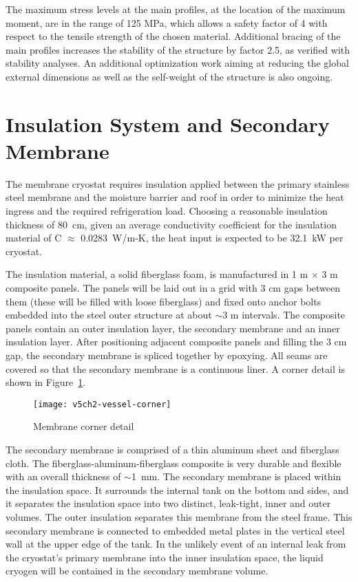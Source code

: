 The maximum stress levels at the main profiles, at the location of 
the maximum moment, are in the range of 125 MPa, which allows a 
safety factor of 4 with respect to the tensile strength of the 
chosen material. Additional bracing of the main profiles increases 
the stability of the structure by factor 2.5, as verified with 
stability analyses.  An additional optimization work aiming at 
reducing the global external dimensions as well as the self-weight 
of the structure is also ongoing. 

\section{Insulation System and Secondary Membrane}
\label{subsec:insul-2nd-mem}

The membrane cryostat requires insulation applied between the 
primary stainless steel membrane and the moisture barrier and 
roof in order to minimize the heat ingress and the required 
refrigeration load. Choosing a reasonable insulation 
thickness of 80~cm, given an average conductivity coefficient 
for the insulation material of C $\approx$ 0.0283~W/m-K, the 
heat input is expected to be 32.1~kW 
per cryostat. %



The insulation material, a solid fiberglass foam, is manufactured in 1 m 
$\times$ 3 m composite panels. The panels will be laid out in a grid with 
3 cm gaps between them (these will be filled with loose fiberglass) and 
fixed onto anchor bolts embedded into the steel outer structure
at about $\sim$3 m intervals. 
The composite panels contain an outer insulation layer, the secondary 
membrane and an inner insulation layer. After positioning adjacent 
composite panels and filling the 3 cm gap, the secondary membrane 
is spliced together by epoxying. All seams are covered so that the secondary
membrane is a continuous liner. A corner detail is shown 
in Figure~\ref{fig:vessel-corner}.


\begin{figure}[htbp]
\centering
\texttt{[image: v5ch2-vessel-corner]}
\caption{Membrane corner detail}
\label{fig:vessel-corner} %
\end{figure}

The secondary membrane is comprised of a thin aluminum sheet and 
fiberglass cloth. The fiberglass-aluminum-fiberglass composite is 
very durable and flexible with an overall thickness of $\sim$1~mm.  
The secondary membrane is placed within the insulation space. It 
surrounds the internal tank on the bottom and sides, and it 
separates the insulation space into two distinct, leak-tight, 
inner and outer volumes. The outer insulation separates this 
membrane from the steel frame. This secondary membrane is connected 
to embedded metal plates in the vertical steel wall at the upper 
edge of the tank. In the unlikely event of an internal leak from 
the cryostat's primary membrane into the inner insulation space, 
the liquid cryogen will be contained in the 
secondary membrane volume.  

